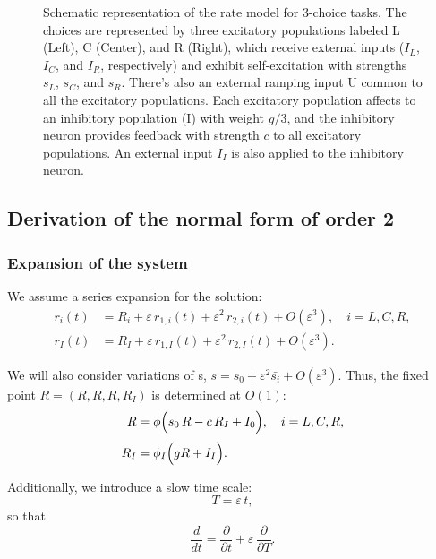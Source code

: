 \documentclass[ENG]{fancynotes}
\begin{document}
\begin{figure}[H]
\begin{tikzpicture}[>=Stealth,
  neuron/.style={draw, circle, minimum size=2.0cm, inner sep=4pt, font=\Large},
  arrowlabel/.style={draw=none, fill=none, font=\Large}]
\end{tikzpicture}
\caption{Schematic representation of the rate model for 3-choice tasks. The choices are represented by three excitatory populations labeled L (Left), C (Center), and R (Right), which receive external inputs ($I_L$, $I_C$, and $I_R$, respectively) and exhibit self-excitation with strengths $s_L$, $s_C$, and $s_R$. There's also an external ramping input U common to all the excitatory populations. Each excitatory population affects to an inhibitory population (I) with weight $g/3$, and the inhibitory neuron provides feedback with strength $c$ to all excitatory populations. An external input $I_I$ is also applied to the inhibitory neuron.}
\label{fig:model-rates}
\end{figure}
\newpage


\subsection{Derivation of the normal form of order 2}
\subsubsection{Expansion of the system}
We assume a series expansion for the solution:
\begin{align}
  r_i(t) &= R_i + \varepsilon\,r_{1,i}(t) + \varepsilon^2\,r_{2,i}(t) + O(\varepsilon^3), \quad i=L,C,R, \label{eq:exp_ex}\\[1mm]
  r_I(t) &= R_I + \varepsilon\,r_{1,I}(t) + \varepsilon^2\,r_{2,I}(t) + O(\varepsilon^3). \label{eq:exp_inh}
\end{align}


We will also consider variations of s,  $s = s_0 +\varepsilon^2 \bar{s_i} + O(\varepsilon^3)$. 
Thus, the fixed point \(R=(R,R,R,R_I)\) is determined at \(O(1)\):
\begin{align}
  R &= \phi\Bigl(s_0\,R - c\,R_I + I_0  \Bigr), \quad i=L,C,R, \label{eq:fixed_ex}\\[1mm]
  R_I &= \phi_I\Bigl({g}R+I_I\Bigr). \label{eq:fixed_inh}
\end{align}

Additionally, we introduce a slow time scale:
\[
T = \varepsilon\,t,
\]
so that
\[
\frac{d}{dt} = \frac{\partial}{\partial t} + \varepsilon\,\frac{\partial}{\partial T}.
\]
\end{document}
